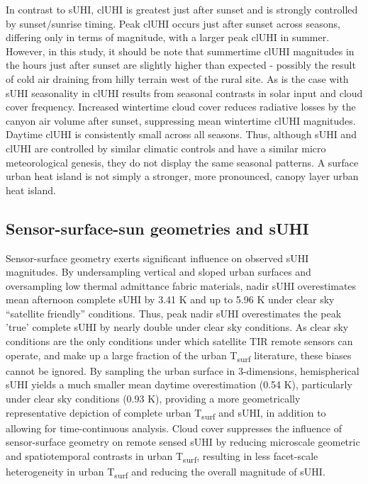 \begin{bibunit}
In contrast to sUHI, clUHI is greatest just after sunset and is strongly controlled by sunset/sunrise timing. Peak clUHI occurs just after sunset across seasons, differing only in terms of magnitude, with a larger peak clUHI in summer. However, in this study, it should be note that summertime clUHI magnitudes in the hours just after sunset are slightly higher than expected \citep{Runnalls2000} - possibly the result of cold air draining from hilly terrain west of the rural site. As is the case with sUHI seasonality in clUHI results from seasonal contrasts in solar input and cloud cover frequency. Increased wintertime cloud cover reduces radiative losses by the canyon air volume after sunset, suppressing mean wintertime clUHI magnitudes. Daytime clUHI is consistently small across all seasons. Thus, although sUHI and clUHI are controlled by similar climatic controls and have a similar micro meteorological genesis, they do not display the same seasonal patterns. A surface urban heat island is not simply a stronger, more pronounced, canopy layer urban heat island.

\subsection{Sensor-surface-sun geometries and sUHI}

Sensor-surface geometry exerts significant influence on observed sUHI magnitudes. By undersampling vertical and sloped urban surfaces and oversampling low thermal admittance fabric materials, nadir sUHI overestimates mean afternoon complete sUHI by 3.41 \si{\kelvin} and up to 5.96 \si{\kelvin} under clear sky “satellite friendly” conditions. Thus, peak nadir sUHI overestimates the peak 'true' complete sUHI by nearly double under clear sky conditions. As clear sky conditions are the only conditions under which satellite TIR remote sensors can operate, and make up a large fraction of the urban T\textsubscript{surf} literature, these biases cannot be ignored. By sampling the urban surface in 3-dimensions, hemispherical sUHI yields a much smaller mean daytime overestimation (0.54 \si{\kelvin}), particularly under clear sky conditions (0.93 \si{\kelvin}), providing a more geometrically representative depiction of complete urban T\textsubscript{surf} and sUHI, in addition to allowing for time-continuous analysis. Cloud cover suppresses the influence of sensor-surface geometry on remote sensed sUHI by reducing microscale geometric and spatiotemporal contrasts in urban T\textsubscript{surf}, resulting in less facet-scale heterogeneity in urban T\textsubscript{surf} and reducing the overall magnitude of sUHI.


\end{bibunit}
